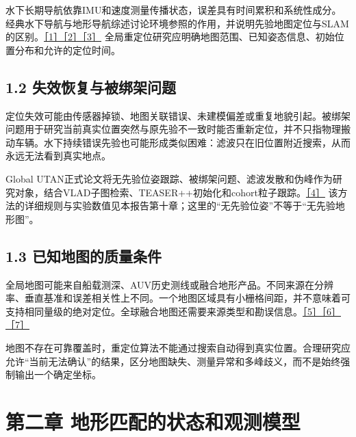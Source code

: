 水下长期导航依靠IMU和速度测量传播状态，误差具有时间累积和系统性成分。经典水下导航与地形导航综述讨论环境参照的作用，并说明先验地图定位与SLAM的区别。\href{https://people.csail.mit.edu/lpaull/publications/Paull_JOE_2014.pdf}{［1］}\href{https://eprints.soton.ac.uk/153897/1/Carreno_2010_-_A_survey__on_TBN_for_AUVs.pdf}{［2］}\href{https://doi.org/10.1016/j.oceaneng.2017.04.047}{［3］} 全局重定位研究应明确地图范围、已知姿态信息、初始位置分布和允许的定位时间。

\hypertarget{ux5931ux6548ux6062ux590dux4e0eux88abux7ed1ux67b6ux95eeux9898}{%
\subsection{1.2 失效恢复与被绑架问题}\label{ux5931ux6548ux6062ux590dux4e0eux88abux7ed1ux67b6ux95eeux9898}}

定位失效可能由传感器掉锁、地图关联错误、未建模偏差或重复地貌引起。被绑架问题用于研究当前真实位置突然与原先验不一致时能否重新定位，并不只指物理搬动车辆。水下持续错误先验也可能形成类似困难：滤波只在旧位置附近搜索，从而永远无法看到真实地点。

Global UTAN正式论文将无先验位姿跟踪、被绑架问题、滤波发散和伪峰作为研究对象，结合VLAD子图检索、TEASER++初始化和cohort粒子跟踪。\href{https://doi.org/10.1109/TIM.2026.3716492}{［4］} 该方法的详细规则与实验数值见本报告第十章；这里的``无先验位姿''不等于``无先验地形图''。

\hypertarget{ux5df2ux77e5ux5730ux56feux7684ux8d28ux91cfux6761ux4ef6}{%
\subsection{1.3 已知地图的质量条件}\label{ux5df2ux77e5ux5730ux56feux7684ux8d28ux91cfux6761ux4ef6}}

全局地图可能来自船载测深、AUV历史测线或融合地形产品。不同来源在分辨率、垂直基准和误差相关性上不同。一个地图区域具有小栅格间距，并不意味着可支持相同量级的绝对定位。全球融合地图还需要来源类型和勘误信息。\href{https://www.gebco.net/data_and_products/gridded_bathymetry_data/}{［5］}\href{https://www.ncei.noaa.gov/products/etopo-global-relief-model}{［6］}\href{https://www.gebco.net/data-products/gridded-bathymetry-data/data-set-errata}{［7］}

地图不存在可靠覆盖时，重定位算法不能通过搜索自动得到真实位置。合理研究应允许``当前无法确认''的结果，区分地图缺失、测量异常和多峰歧义，而不是始终强制输出一个确定坐标。

\hypertarget{ux7b2cux4e8cux7ae0-ux5730ux5f62ux5339ux914dux7684ux72b6ux6001ux548cux89c2ux6d4bux6a21ux578b}{%
\section{第二章 地形匹配的状态和观测模型}\label{ux7b2cux4e8cux7ae0-ux5730ux5f62ux5339ux914dux7684ux72b6ux6001ux548cux89c2ux6d4bux6a21ux578b}}

